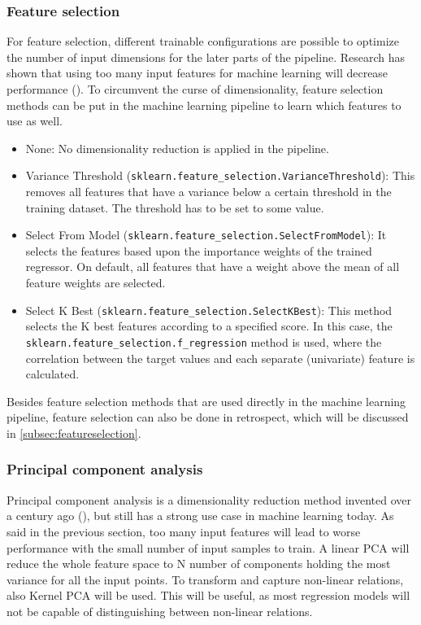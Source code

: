 \subsubsection{Feature selection}
For feature selection, different trainable configurations are possible to optimize the number of input dimensions for the later parts of the pipeline. Research has shown that using too many input features for machine learning will decrease performance (\cite{Trunk1979-sq}). To circumvent the curse of dimensionality, feature selection methods can be put in the machine learning pipeline to learn which features to use as well. 

\begin{itemize}
	\item None: No dimensionality reduction is applied in the pipeline.
	\item Variance Threshold (\verb|sklearn.feature_selection.VarianceThreshold|): This removes all features that have a variance below a certain threshold in the training dataset. The threshold has to be set to some value.
	\item Select From Model (\verb|sklearn.feature_selection.SelectFromModel|): It selects the features based upon the importance weights of the trained regressor. On default, all features that have a weight above the mean of all feature weights are selected.
	\item Select K Best (\verb|sklearn.feature_selection.SelectKBest|): This method selects the K best features according to a specified score. In this case, the \\\verb|sklearn.feature_selection.f_regression| method is used, where the correlation between the target values and each separate (univariate) feature is calculated.
\end{itemize}

Besides feature selection methods that are used directly in the machine learning pipeline, feature selection can also be done in retrospect, which will be discussed in \autoref{subsec:featureselection}.

\subsubsection{Principal component analysis}
Principal component analysis is a dimensionality reduction method invented over a century ago (\cite{Pearson1901-de}), but still has a strong use case in machine learning today. As said in the previous section, too many input features will lead to worse performance with the small number of input samples to train. A linear PCA will reduce the whole feature space to N number of components holding the most variance for all the input points. To transform and capture non-linear relations, also Kernel PCA will be used. This will be useful, as most regression models will not be capable of distinguishing between non-linear relations.

